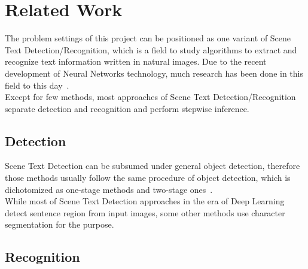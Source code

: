 \section{Related Work}

The problem settings of this project can be positioned as one variant of Scene Text Detection/Recognition, which
is a field to study algorithms to extract and recognize text information written in natural images.
Due to the recent development of Neural Networks technology,
much research has been done in this field to this day~\cite{long2018scene}.\\
Except for few methods\cite{liu2018fots}\cite{lyu2018mask}, most approaches of Scene Text Detection/Recognition
separate detection and recognition and perform stepwise inference.

\subsection{Detection}

Scene Text Detection can be subsumed under general object detection, therefore those methods usually follow
the same procedure of object detection, which is dichotomized as one-stage methods and two-stage ones~\cite{liu2018deep}.\\

While most of Scene Text Detection approaches in the era of Deep Learning detect sentence region from input images,
some other methods use character segmentation for the purpose.

\subsection{Recognition}


